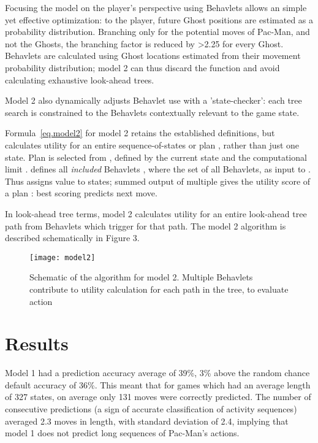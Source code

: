 \documentclass[conference]{IEEEtran}
\begin{document}
Focusing the model on the player's perspective using Behavlets allows an simple yet effective optimization: to the player, future Ghost positions are estimated as a probability distribution. Branching only for the potential moves of Pac-Man, and not the Ghosts, the branching factor is reduced by \textgreater2.25 for every Ghost. Behavlets are calculated using Ghost locations estimated from their movement probability distribution; model 2 can thus discard the  function and avoid calculating exhaustive look-ahead trees.

Model 2 also dynamically adjusts Behavlet use with a 'state-checker': each tree search is constrained to the Behavlets contextually relevant to the game state.

Formula~\ref{eq.model2} for model 2 retains the established definitions, but calculates utility for an entire sequence-of-states or plan , rather than just one state. Plan  is selected from , defined by the current state and the computational limit .  defines all \textit{included} Behavlets , where  the set of all Behavlets, as input to . Thus  assigns value to states; summed output of multiple  gives the utility score of a plan : best scoring  predicts next move.


In look-ahead tree terms, model 2 calculates utility for an entire look-ahead tree path from Behavlets which trigger for that path. The model 2 algorithm is described schematically in Figure 3.




\begin{figure*}[!ht]
	\centering
	\texttt{[image: model2]}
	\caption{Schematic of the algorithm for model 2. Multiple Behavlets contribute to utility calculation for each path in the tree, to evaluate action }
	\label{fig.model2}
\end{figure*}

\section{Results}
\label{results}
Model 1 had a prediction accuracy average of 39\%, 3\% above the random chance default accuracy of 36\%. This meant that for games which had an average length of 327 states, on average only 131 moves were correctly predicted. The number of consecutive predictions (a sign of accurate classification of activity sequences) averaged 2.3 moves in length, with standard deviation of 2.4, implying that model 1 does not predict long sequences of Pac-Man's actions.
\end{document}
